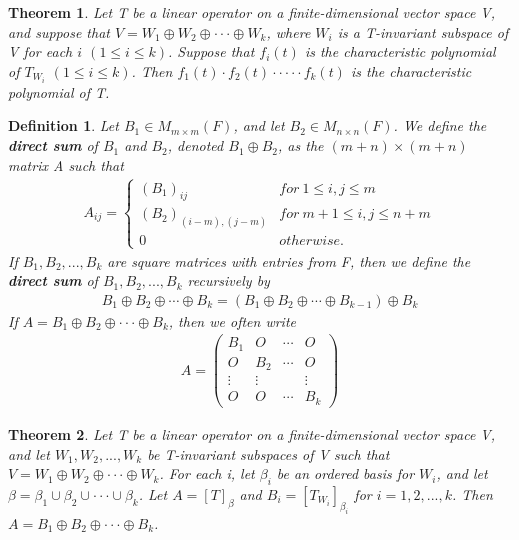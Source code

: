 \documentclass{article}
\newcommand{\bd}[1]{\textbf{#1}}
\newcommand*\bpmat[0]{\begin{pmatrix}}
\newcommand*\epmat[0]{\end{pmatrix}}
\theoremstyle{plain}
\newtheorem{theorem}{Theorem}[section]
\newtheorem*{definition1}{Definition}
\theoremstyle{plain} %
\begin{document}
\begin{theorem}
  Let T be a linear operator on a finite-dimensional vector space V, and suppose that $V = W_1 \oplus W_2 \oplus ··· \oplus W_k$, where $W_i$ is a T-invariant subspace of V for each $i$ $(1 \leq i \leq k)$. Suppose that $f_i(t)$ is the characteristic polynomial of $T_{W_i}$ $(1 \leq i \leq k)$. Then $f_1(t)\cdot f_2(t)\cdot  ··· \cdot f_k(t)$ is the characteristic polynomial of T.
\end{theorem}

\begin{definition1}
  Let $B_1 \in M_{m\times m}(F)$, and let $B_2 \in M_{n\times n}(F)$. We define the \bd{direct sum} of $B_1$ and $B_2$, denoted $B_1 \oplus B_2$, as the $(m+n)\times (m+n)$ matrix A such that
  \begin{align*}
    A_{ij}=
    \begin{cases}
      (B_1)_{ij}&for~1\leq i,j\leq m\\
      (B_2)_{(i-m),(j-m)}&for~m+1\leq i,j\leq n+m\\
      0&otherwise.
    \end{cases}
  \end{align*}
  If $B_1, B_2,...,B_k$ are square matrices with entries from F, then we define the \bd{direct sum} of $B_1, B_2,...,B_k$ recursively by
  \begin{align*}
    B_1\oplus B_2\oplus\cdots\oplus B_k=(B_1\oplus B_2\oplus \cdots\oplus B_{k-1})\oplus B_k
  \end{align*}
  If $A = B_1 \oplus B_2 \oplus···\oplus B_k$, then we often write
  \begin{align*}
    A=\bpmat
    B_1&O&\cdots&O\\
    O&B_2&\cdots&O\\
    \vdots&\vdots&&\vdots\\
    O&O&\cdots&B_k
    \epmat
  \end{align*}
\end{definition1}

\begin{theorem}
  Let T be a linear operator on a finite-dimensional vector space V, and let $W_1, W_2,..., W_k$ be T-invariant subspaces of V such that $V = W_1 \oplus W_2 \oplus···\oplus W_k$. For each i, let $\beta_i$ be an ordered basis for $W_i$, and let $\beta = \beta_1 \cup \beta_2 \cup···\cup \beta_k$. Let $A = [T]_\beta$ and $B_i = [T_{W_i}]_{\beta_i}$ for $i = 1, 2,...,k$. Then $A = B_1 \oplus B_2 \oplus···\oplus B_k$.
\end{theorem}
\end{document}
